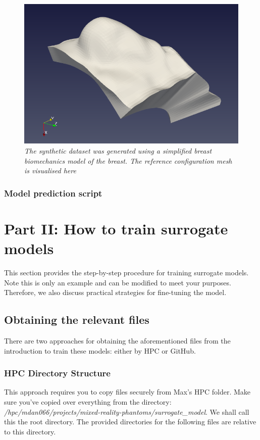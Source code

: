 \documentclass[11pt]{article}
\begin{document}
\begin{figure}
\centering
\includegraphics[scale=0.7]{Images/breast/machine_learning/breast_visualisation.png}
\caption{\textit{\label{fig4}The synthetic dataset was generated using a simplified breast biomechanics model of the breast. The reference configuration mesh is visualised here}} 
\end{figure}

\subsubsection{Model prediction script}


\pagebreak

\section{Part II: How to train surrogate models}
This section provides the step-by-step procedure for training surrogate models. Note this is only an example and can be modified to meet your purposes. Therefore, we also discuss practical strategies for fine-tuning the model. 

\subsection{Obtaining the relevant files}
There are two approaches for obtaining the aforementioned files from the introduction to train these models: either by HPC or GitHub. 

\subsubsection{HPC Directory Structure}
This approach requires you to copy files securely from Max's HPC folder. Make sure you've copied over everything from the directory: \textit{/hpc/mdan066/projects/mixed-reality-phantoms/surrogate\_model}. We shall call this the root directory. The provided directories for the following files are relative to this directory. 
\end{document}
